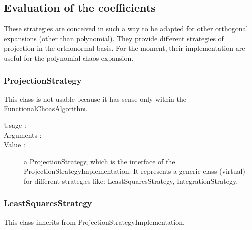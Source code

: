 \newpage
\subsection{Evaluation of the coefficients}

These strategies are conceived in such a way to be adapted for other orthogonal expansions (other than polynomial). They provide different strategies of projection in the orthonormal basis. For the moment, their implementation are useful for the polynomial chaos expansion.

\subsubsection{ProjectionStrategy}

 This class is not usable because it has sense only within the FunctionalChoasAlgorithm.


\begin{description}
\item[Usage :] \rule{0pt}{1em}

\item[Arguments :]  \rule{0pt}{1em}

\item[Value :]  a ProjectionStrategy, which is the interface of the ProjectionStrategyImplementation. It represents a generic class (virtual) for different strategies like: LeastSquaresStrategy, IntegrationStrategy.

\end{description}


\newpage      \subsubsection{LeastSquaresStrategy}

This class inherits from ProjectionStrategyImplementation.\\

